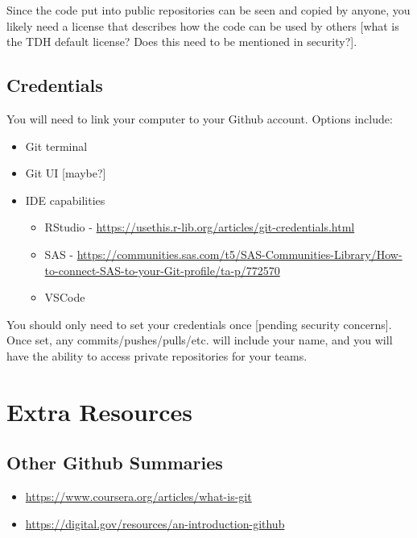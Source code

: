 \documentclass[
  letterpaper,
  DIV=11,
  numbers=noendperiod]{scrreprt}
\begin{document}
Since the code put into public repositories can be seen and copied by
anyone, you likely need a license that describes how the code can be
used by others {[}what is the TDH default license? Does this need to be
mentioned in security?{]}.

\hypertarget{credentials}{%
\section{Credentials}\label{credentials}}

You will need to link your computer to your Github account. Options
include:

\begin{itemize}
\item
  Git terminal
\item
  Git UI {[}maybe?{]}
\item
  IDE capabilities

  \begin{itemize}
  \item
    RStudio -
    \url{https://usethis.r-lib.org/articles/git-credentials.html}
  \item
    SAS -
    \url{https://communities.sas.com/t5/SAS-Communities-Library/How-to-connect-SAS-to-your-Git-profile/ta-p/772570}
  \item
    VSCode
  \end{itemize}
\end{itemize}

You should only need to set your credentials once {[}pending security
concerns{]}. Once set, any commits/pushes/pulls/etc. will include your
name, and you will have the ability to access private repositories for
your teams.


\hypertarget{extra-resources}{%
\chapter{Extra Resources}\label{extra-resources}}

\hypertarget{other-github-summaries}{%
\section{Other Github Summaries}\label{other-github-summaries}}

\begin{itemize}
\item
  \url{https://www.coursera.org/articles/what-is-git}
\item
  \url{https://digital.gov/resources/an-introduction-github}
\end{itemize}
\end{document}
